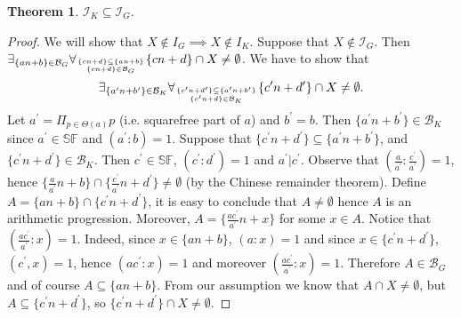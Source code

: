 \documentclass{amsart}
\newtheorem{thm}{Theorem}
\theoremstyle{definition}
\theoremstyle{definition}
\newcommand{\I}{\mathcal I}
\newcommand{\SqrFr}{\mathbb{SF}}
\begin{document}
\begin{thm}
$\I_K \subseteq \I_G$.
\end{thm}	   
\begin{proof}
We will show that $X \not\in I_G \implies X \not\in I_K$.
Suppose that $X \not\in \I_G$. Then
$\exists_{\{an+b\}\in \mathcal{B}_G} \forall_{\{cn+d\} \subseteq \{an+b\} \atop \{cn+d\}\in \mathcal{B}_G} \{cn+d\} \cap X \not= \emptyset$.
We have to show that 
$$\exists_{\{a^\prime n+b^\prime\}\in \mathcal{B}_K} \forall_{\{c^\prime n+d^\prime \} \subseteq \{a^\prime n+b^\prime\} \atop \{c^\prime n+d\}
\in \mathcal{B}_K} \{c^\prime n+d^\prime \} \cap X \not= \emptyset.$$
Let $a^\prime = \Pi_{p \in \Theta(a)} p$ (i.e. squarefree part of $a$)
and $b^\prime = b$. Then $\{a^\prime n+b^\prime\} \in \mathcal{B}_K$
since $a^\prime \in \SqrFr$ and $(a^\prime : b) = 1$.
Suppose that $\{c^\prime n+d^\prime \} \subseteq \{a^\prime n+b^\prime\}$,
and $\{c^\prime n+d^\prime\}\in \mathcal{B}_K$. Then $c^\prime \in \SqrFr$, $(c^\prime:d^\prime)=1$
and $a^\prime | c^\prime$. 
Observe that $(\frac{a}{a^\prime} : \frac{c^\prime}{a^\prime}) = 1$,
hence
$\{\frac{a}{a^\prime} n + b\} \cap \{\frac{c^\prime}{a^\prime} n + d^\prime \} \not= \emptyset$
(by the Chinese remainder theorem).
Define $A = \{a n+b \} \cap \{c^\prime n+d^\prime \}$, it is easy to 
conclude that $A \not= \emptyset$ hence $A$ is an arithmetic progression.
Moreover, $A = \{\frac{a c^\prime}{a^\prime} n + x\}$
for some $x \in A$.
Notice that $(\frac{a c^\prime}{a^\prime} : x) = 1$. Indeed, 
since $x \in \{a n+b \}$, $(a : x) = 1$ and since
$x \in \{c^\prime n+d^\prime \}$, $(c^\prime, x) = 1$,
hence $(a c^\prime : x) = 1$ and moreover
$(\frac{a c^\prime}{a^\prime} : x) = 1$.
Therefore $A \in \mathcal{B}_G$ and of course $A \subseteq \{a n+b \}$.
From our assumption we know that $A \cap X \not= \emptyset$,
but $A \subseteq \{c^\prime n+d^\prime \}$, 
so $\{c^\prime n+d^\prime \} \cap X \not= \emptyset$.
\end{proof}
\end{document}
